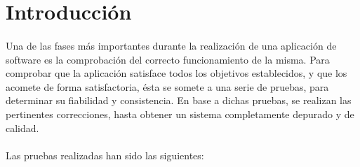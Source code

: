 \section{Introducción}

  \paragraph{}Una de las fases más importantes durante la realización de una
  aplicación de software es la comprobación del correcto funcionamiento de la
  misma. Para comprobar que la aplicación satisface todos los objetivos
  establecidos, y que los acomete de forma satisfactoria, ésta se somete a una
  serie de pruebas, para determinar su fiabilidad y consistencia. En base a
  dichas pruebas, se realizan las pertinentes correcciones, hasta obtener un
  sistema completamente depurado y de calidad.

 \paragraph{}Las pruebas realizadas han sido las siguientes:

